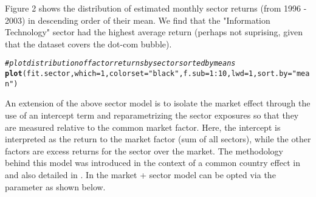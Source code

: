 \documentclass[a4paper]{article}\usepackage[]{graphicx}\usepackage[]{color}
\makeatletter
\newcommand{\hlnum}[1]{\textcolor[rgb]{0.686,0.059,0.569}{#1}}%
\newcommand{\hlstr}[1]{\textcolor[rgb]{0.192,0.494,0.8}{#1}}%
\newcommand{\hlcom}[1]{\textcolor[rgb]{0.678,0.584,0.686}{\textit{#1}}}%
\newcommand{\hlopt}[1]{\textcolor[rgb]{0,0,0}{#1}}%
\newcommand{\hlstd}[1]{\textcolor[rgb]{0.345,0.345,0.345}{#1}}%
\newcommand{\hlkwc}[1]{\textcolor[rgb]{0.333,0.667,0.333}{#1}}%
\newcommand{\hlkwd}[1]{\textcolor[rgb]{0.737,0.353,0.396}{\textbf{#1}}}%
\newenvironment{kframe}{%
 \def\at@end@of@kframe{}%
 \ifinner\ifhmode%
  \def\at@end@of@kframe{\end{minipage}}%
  \begin{minipage}{\columnwidth}%
 \fi\fi%
 \def\FrameCommand##1{\hskip\@totalleftmargin \hskip-\fboxsep
 \colorbox{shadecolor}{##1}\hskip-\fboxsep
     \hskip-\linewidth \hskip-\@totalleftmargin \hskip\columnwidth}%
 \MakeFramed {\advance\hsize-\width
   \@totalleftmargin\z@ \linewidth\hsize
   \@setminipage}}%
 {\par\unskip\endMakeFramed%
 \at@end@of@kframe}
\newenvironment{knitrout}{}{} %
\makeatother
\begin{document}
Figure 2 shows the distribution of estimated monthly sector returns (from 1996 - 2003) in descending order of their mean. We find that the "Information Technology" sector had the highest average return (perhaps not suprising, given that the dataset covers the dot-com bubble).

\newpage
\begin{knitrout}
\color{fgcolor}\begin{kframe}
\begin{alltt}
\hlcom{# plot distribution of factor returns by sector sorted by means}
\hlkwd{plot}\hlstd{(fit.sector,} \hlkwc{which}\hlstd{=}\hlnum{1}\hlstd{,} \hlkwc{colorset}\hlstd{=}\hlstr{"black"}\hlstd{,} \hlkwc{f.sub}\hlstd{=}\hlnum{1}\hlopt{:}\hlnum{10}\hlstd{,} \hlkwc{lwd}\hlstd{=}\hlnum{1}\hlstd{,} \hlkwc{sort.by}\hlstd{=}\hlstr{"mean"}\hlstd{)}
\end{alltt}


{\ttfamily\noindent\bfseries\color{errorcolor}{\#\# Error in xy.coords(x, y, xlabel, ylabel, log): 'x' is a list, but does not have components 'x' and 'y'}}\end{kframe}
\end{knitrout}

An extension of the above sector model is to isolate the market effect through the use of an intercept term and reparametrizing the sector exposures so that they are measured relative to the common market factor. Here, the intercept is interpreted as the return to the market factor (sum of all sectors), while the other factors are excess returns for the sector over the market. The methodology behind this model was introduced in the context of a common country effect in \citet{heston1995industry} and also detailed in \citet{menchero2010characteristics}. In  the market + sector model can be opted via the parameter  as shown below.
\end{document}
